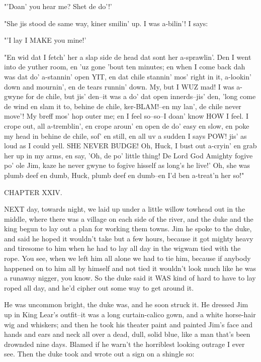 "'Doan' you hear me?  Shet de do'!'

"She jis stood de same way, kiner smilin' up.  I was a-bilin'!  I says:

"'I lay I MAKE you mine!'

"En wid dat I fetch' her a slap side de head dat sont her a-sprawlin'.
Den I went into de yuther room, en 'uz gone 'bout ten minutes; en when I
come back dah was dat do' a-stannin' open YIT, en dat chile stannin' mos'
right in it, a-lookin' down and mournin', en de tears runnin' down.  My,
but I WUZ mad!  I was a-gwyne for de chile, but jis' den--it was a do'
dat open innerds--jis' den, 'long come de wind en slam it to, behine de
chile, ker-BLAM!--en my lan', de chile never move'!  My breff mos' hop
outer me; en I feel so--so--I doan' know HOW I feel.  I crope out, all
a-tremblin', en crope aroun' en open de do' easy en slow, en poke my head
in behine de chile, sof' en still, en all uv a sudden I says POW! jis' as
loud as I could yell.  SHE NEVER BUDGE!  Oh, Huck, I bust out a-cryin' en
grab her up in my arms, en say, 'Oh, de po' little thing!  De Lord God
Amighty fogive po' ole Jim, kaze he never gwyne to fogive hisself as
long's he live!'  Oh, she was plumb deef en dumb, Huck, plumb deef en
dumb--en I'd ben a-treat'n her so!"




CHAPTER XXIV.

NEXT day, towards night, we laid up under a little willow towhead out in
the middle, where there was a village on each side of the river, and the
duke and the king begun to lay out a plan for working them towns.  Jim he
spoke to the duke, and said he hoped it wouldn't take but a few hours,
because it got mighty heavy and tiresome to him when he had to lay all
day in the wigwam tied with the rope.  You see, when we left him all
alone we had to tie him, because if anybody happened on to him all by
himself and not tied it wouldn't look much like he was a runaway nigger,
you know. So the duke said it WAS kind of hard to have to lay roped all
day, and he'd cipher out some way to get around it.

He was uncommon bright, the duke was, and he soon struck it.  He dressed
Jim up in King Lear's outfit--it was a long curtain-calico gown, and a
white horse-hair wig and whiskers; and then he took his theater paint and
painted Jim's face and hands and ears and neck all over a dead, dull,
solid blue, like a man that's been drownded nine days.  Blamed if he
warn't the horriblest looking outrage I ever see.  Then the duke took and
wrote out a sign on a shingle so:

